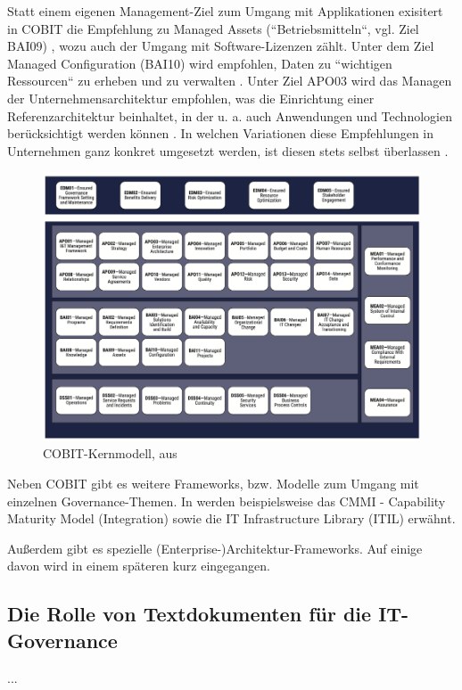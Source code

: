 Statt einem eigenen Management-Ziel zum Umgang mit Applikationen exisitert in COBIT die Empfehlung zu Managed Assets (``Betriebsmitteln``, vgl. Ziel BAI09) \cite[S. 209-214]{isaca1}, wozu auch der Umgang mit Software-Lizenzen zählt. Unter dem Ziel Managed Configuration (BAI10) wird empfohlen, Daten zu ``wichtigen Ressourcen`` zu erheben und zu verwalten \cite[S. 73]{gaulke}. Unter Ziel APO03 wird das Managen der Unternehmensarchitektur empfohlen, was die Einrichtung einer Referenzarchitektur beinhaltet, in der u. a. auch Anwendungen und Technologien berücksichtigt werden können \cite[S. 70]{gaulke}. In welchen Variationen diese Empfehlungen in Unternehmen ganz konkret umgesetzt werden, ist diesen stets selbst überlassen \cite[S. 65]{gaulke}.
 
\begin{figure}[h]
\centering
\includegraphics[scale=0.9]{content/pics/Picture_7.png}
\caption{COBIT-Kernmodell, aus \cite[S. 21]{isaca2}}
\label{Abbildung:isaca}
\end{figure}

Neben COBIT gibt es weitere Frameworks, bzw. Modelle zum Umgang mit einzelnen Governance-Themen. In \cite[S. 127-133]{gaulke} werden beispielsweise das CMMI - Capability Maturity Model (Integration) sowie die IT Infrastructure Library (ITIL) erwähnt. 
 
Außerdem gibt es spezielle (Enterprise-)Architektur-Frameworks. Auf einige davon wird in einem späteren kurz eingegangen. 

\subsection{Die Rolle von Textdokumenten für die IT-Governance}
...

